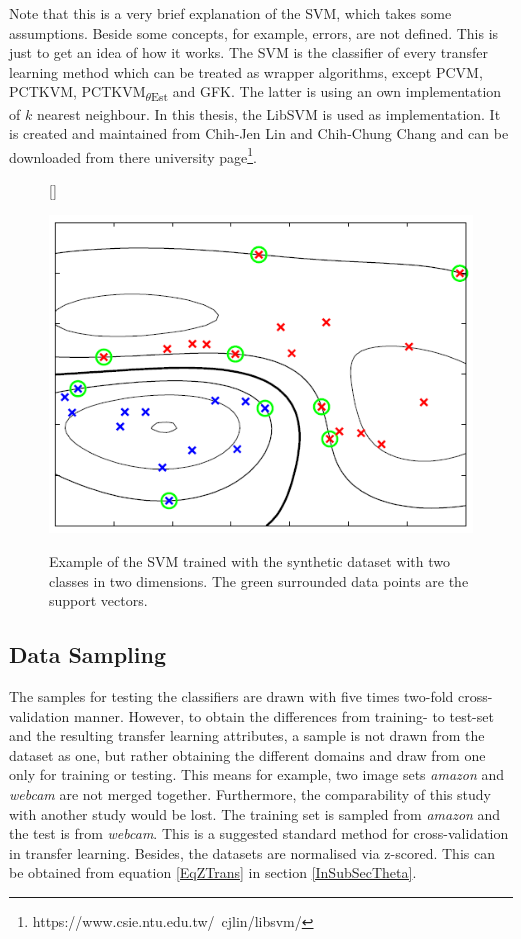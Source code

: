 Note that this is a very brief explanation of the \acs{SVM}, which takes some assumptions. Beside some concepts, for example, errors, are not defined.
This is just to get an idea of how it works.
The \acs{SVM} is the classifier of every transfer learning method which can be treated as wrapper algorithms, except \acs{PCVM}, \acs{PCTKVM}, \acs{PCTKVM}\textsubscript{$\theta$Est} and \acs{GFK}.
The latter is using an own implementation of $k$ nearest neighbour.
In this thesis, the LibSVM is used as implementation.
It is created and maintained from Chih-Jen Lin and Chih-Chung Chang and can be downloaded from there university page\footnote{https://www.csie.ntu.edu.tw/~cjlin/libsvm/}.
\begin{figure}
	\centering
	[\FBwidth]
	{\caption[Example of SVM Clasification]{Example of the SVM trained with the synthetic dataset with two classes in two dimensions. The green surrounded data points are the support vectors. \cite[p. 331]{Bishop.2009}}}
	{\includegraphics[width=\linewidth]{figures/SVMProd.png}\label{FigSVMProd}}
\end{figure}

\subsection{Data Sampling}\label{EmSubSecDataS}
The samples for testing the classifiers are drawn with five times two-fold cross-validation manner.
However, to obtain the differences from training- to test-set and the resulting transfer learning attributes, a sample is not drawn from the dataset as one, but rather obtaining the different domains and draw from one only for training or testing.
This means for example, two image sets \textit{amazon} and \textit{webcam} are not merged together.
Furthermore, the comparability of this study with another study would be lost.
The training set is sampled from \textit{amazon} and the test is from \textit{webcam}.
This is a suggested standard method for cross-validation in transfer learning.\cite{Gong.}
Besides, the datasets are normalised via z-scored.
This can be obtained from equation \ref{EqZTrans} in section \ref{InSubSecTheta}.
